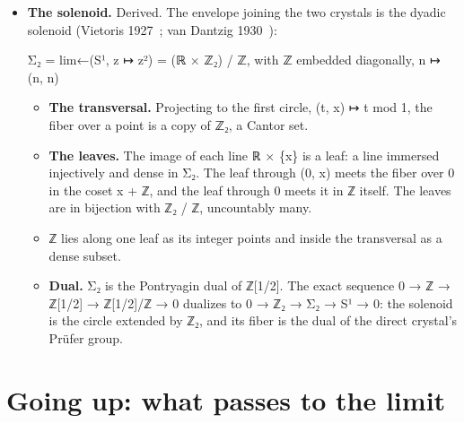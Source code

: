 \begin{itemize}
\begin{itemize}
\item ℤ is countable. ℤ₂ is in bijection with the bit sequences \{0,1\}\textasciicircum{}ℕ and uncountable, by Cantor's diagonal. ℤ₂ \textbackslash{} ℤ is uncountable.
\item Its part in ℚ, the rationals with odd denominators outside ℤ, is countable: the eventually periodic expansions. The machine reaches their windows through the exact quotient's inverse (1/3, above).
\item The computable elements of ℤ₂ are countable, and a program can produce any window of one. All but countably many elements are not computable: each has a window at every w, as every element does, yet no program produces its windows for every w.
\end{itemize}
\item \textbf{The solenoid.} Derived. The envelope joining the two crystals is the dyadic solenoid (Vietoris 1927~\cite{src:Vietoris-1927}; van Dantzig 1930~\cite{src:van-Dantzig-1930}):

Σ₂ = lim←(S¹, z ↦ z²) = (ℝ × ℤ₂) / ℤ, with ℤ embedded diagonally, n ↦ (n, n)

\begin{itemize}
\item \textbf{The transversal.} Projecting to the first circle, (t, x) ↦ t mod 1, the fiber over a point is a copy of ℤ₂, a Cantor set.
\item \textbf{The leaves.} The image of each line ℝ × \{x\} is a leaf: a line immersed injectively and dense in Σ₂. The leaf through (0, x) meets the fiber over 0 in the coset x + ℤ, and the leaf through 0 meets it in ℤ itself. The leaves are in bijection with ℤ₂ / ℤ, uncountably many.
\item ℤ lies along one leaf as its integer points and inside the transversal as a dense subset.
\item \textbf{Dual.} Σ₂ is the Pontryagin dual of ℤ[1/2]. The exact sequence 0 → ℤ → ℤ[1/2] → ℤ[1/2]/ℤ → 0 dualizes to 0 → ℤ₂ → Σ₂ → S¹ → 0: the solenoid is the circle extended by ℤ₂, and its fiber is the dual of the direct crystal's Prüfer group.
\end{itemize}
\end{itemize}

\section{\texorpdfstring{Going up: what passes to the limit}{Going up: what passes to the limit}}

